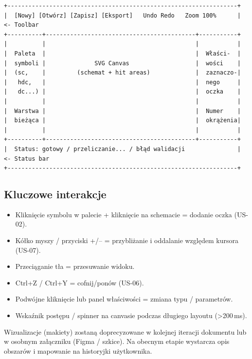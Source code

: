 \documentclass[a4paper,11pt]{article}
\begin{document}
\begin{verbatim}
+------------------------------------------------------------------+
|  [Nowy] [Otwórz] [Zapisz] [Eksport]   Undo Redo   Zoom 100%      |  <- Toolbar
+----------+-------------------------------------------+-----------+
|          |                                           |           |
|  Paleta  |                                           |  Właści-  |
|  symboli |              SVG Canvas                   |  wości    |
|  (sc,    |         (schemat + hit areas)             |  zaznaczo-|
|   hdc,   |                                           |  nego     |
|   dc...) |                                           |  oczka    |
|          |                                           |           |
|  Warstwa |                                           |  Numer    |
|  bieżąca |                                           |  okrążenia|
|          |                                           |           |
+----------+-------------------------------------------+-----------+
|  Status: gotowy / przeliczanie... / błąd walidacji               |  <- Status bar
+------------------------------------------------------------------+
\end{verbatim}

\subsection{Kluczowe interakcje}

\begin{itemize}
  \item Kliknięcie symbolu w palecie + kliknięcie na schemacie = dodanie oczka (US-02).
  \item Kółko myszy / przyciski +/– = przybliżanie i oddalanie względem kursora (US-07).
  \item Przeciąganie tła = przesuwanie widoku.
  \item Ctrl+Z / Ctrl+Y = cofnij/ponów (US-06).
  \item Podwójne kliknięcie lub panel właściwości = zmiana typu / parametrów.
  \item Wskaźnik postępu / spinner na canvasie podczas długiego layoutu (>200\,ms).
\end{itemize}

Wizualizacje (makiety) zostaną doprecyzowane w kolejnej iteracji dokumentu lub w osobnym załączniku (Figma / szkice). Na obecnym etapie wystarcza opis obszarów i mapowanie na historyjki użytkownika.

\pagebreak
\end{document}
